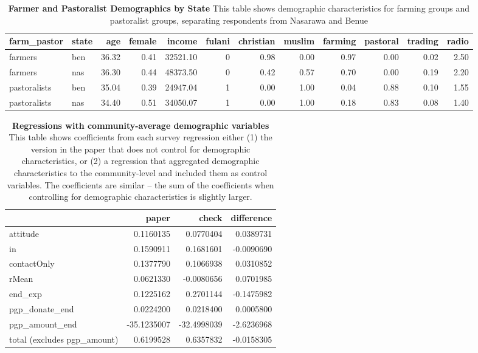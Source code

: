 \documentclass[
]{article}
\begin{document}
\begin{table}[H]
\begin{center}
\label{tab:demo_tab_state1}
\caption{\textbf{Farmer and Pastoralist Demographics by State} This table shows demographic characteristics for farming groups and pastoralist groups, separating respondents from Nasarawa and Benue}
\smallskip

\begin{tabular}{l|l|r|r|r|r|r|r|r|r|r|r}
\hline
farm\_pastor & state & age & female & income & fulani & christian & muslim & farming & pastoral & trading & radio\\
\hline
farmers & ben & 36.32 & 0.41 & 32521.10 & 0 & 0.98 & 0.00 & 0.97 & 0.00 & 0.02 & 2.50\\
\hline
farmers & nas & 36.30 & 0.44 & 48373.50 & 0 & 0.42 & 0.57 & 0.70 & 0.00 & 0.19 & 2.20\\
\hline
pastoralists & ben & 35.04 & 0.39 & 24947.04 & 1 & 0.00 & 1.00 & 0.04 & 0.88 & 0.10 & 1.55\\
\hline
pastoralists & nas & 34.40 & 0.51 & 34050.07 & 1 & 0.00 & 1.00 & 0.18 & 0.83 & 0.08 & 1.40\\
\hline
\end{tabular}


\end{center}
\end{table}

\begin{table}[H]
\begin{center}
\label{tab:comp_df1}
\caption{\textbf{Regressions with community-average demographic variables} This table shows coefficients from each survey regression either (1) the version in the paper that does not control for demographic characteristics, or (2) a regression that aggregated demographic characteristics to the community-level and included them as control variables. The coefficients are similar -- the sum of the coefficients when controlling for demographic characteristics is slightly larger.}
\smallskip

\begin{tabular}{l|r|r|r}
\hline
  & paper & check & difference\\
\hline
attitude & 0.1160135 & 0.0770404 & 0.0389731\\
\hline
in & 0.1590911 & 0.1681601 & -0.0090690\\
\hline
contactOnly & 0.1377790 & 0.1066938 & 0.0310852\\
\hline
rMean & 0.0621330 & -0.0080656 & 0.0701985\\
\hline
end\_exp & 0.1225162 & 0.2701144 & -0.1475982\\
\hline
pgp\_donate\_end & 0.0224200 & 0.0218400 & 0.0005800\\
\hline
pgp\_amount\_end & -35.1235007 & -32.4998039 & -2.6236968\\
\hline
total (excludes pgp\_amount) & 0.6199528 & 0.6357832 & -0.0158305\\
\hline
\end{tabular}


\end{center}
\end{table}
\end{document}

